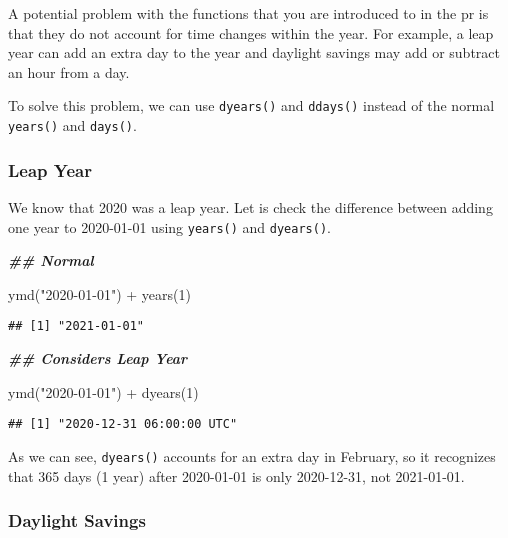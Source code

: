 \documentclass[
]{book}
\newenvironment{Shaded}{\begin{snugshade}}{\end{snugshade}}
\newcommand{\DecValTok}[1]{\textcolor[rgb]{0.00,0.00,0.81}{#1}}
\newcommand{\DocumentationTok}[1]{\textcolor[rgb]{0.56,0.35,0.01}{\textbf{\textit{#1}}}}
\newcommand{\FunctionTok}[1]{\textcolor[rgb]{0.00,0.00,0.00}{#1}}
\newcommand{\NormalTok}[1]{#1}
\newcommand{\SpecialCharTok}[1]{\textcolor[rgb]{0.00,0.00,0.00}{#1}}
\newcommand{\StringTok}[1]{\textcolor[rgb]{0.31,0.60,0.02}{#1}}
\begin{document}
A potential problem with the functions that you are introduced to in the pr is that they do not account for time changes within the year. For example, a leap year can add an extra day to the year and daylight savings may add or subtract an hour from a day.

To solve this problem, we can use \texttt{dyears()} and \texttt{ddays()} instead of the normal \texttt{years()} and \texttt{days()}.

\hypertarget{leap-year}{%
\subsubsection{Leap Year}\label{leap-year}}

We know that 2020 was a leap year. Let is check the difference between adding one year to 2020-01-01 using \texttt{years()} and \texttt{dyears()}.

\begin{Shaded}
\begin{Highlighting}[]
\DocumentationTok{\#\# Normal}

\FunctionTok{ymd}\NormalTok{(}\StringTok{"2020{-}01{-}01"}\NormalTok{) }\SpecialCharTok{+} \FunctionTok{years}\NormalTok{(}\DecValTok{1}\NormalTok{)}
\end{Highlighting}
\end{Shaded}

\begin{verbatim}
## [1] "2021-01-01"
\end{verbatim}

\begin{Shaded}
\begin{Highlighting}[]
\DocumentationTok{\#\# Considers Leap Year}

\FunctionTok{ymd}\NormalTok{(}\StringTok{"2020{-}01{-}01"}\NormalTok{) }\SpecialCharTok{+} \FunctionTok{dyears}\NormalTok{(}\DecValTok{1}\NormalTok{)}
\end{Highlighting}
\end{Shaded}

\begin{verbatim}
## [1] "2020-12-31 06:00:00 UTC"
\end{verbatim}

As we can see, \texttt{dyears()} accounts for an extra day in February, so it recognizes that 365 days (1 year) after 2020-01-01 is only 2020-12-31, not 2021-01-01.

\hypertarget{daylight-savings}{%
\subsubsection{Daylight Savings}\label{daylight-savings}}
\end{document}
